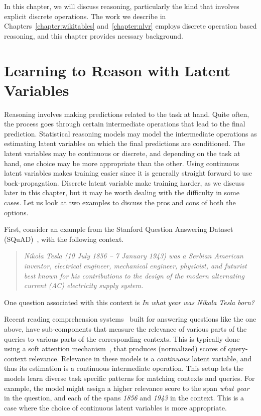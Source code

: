In this chapter, we will discuss reasoning, particularly the kind that involves
explicit discrete operations. The work we describe in
Chapters~\ref{chapter:wikitables} and~\ref{chapter:nlvr} employs discrete
operation based reasoning, and this chapter provides ncessary background.

\section{Learning to Reason with Latent Variables}
Reasoning involves making predictions related to the task at hand. Quite often,
the process goes through certain intermediate operations that lead to the final
prediction. Statistical reasoning models may model the intermediate operations as
estimating latent variables on which the final predictions are conditioned.
The latent variables may be continuous or discrete, and depending on the task at
hand, one choice may be more appropriate than the other. Using continuous latent
variables makes training easier since it is generally straight forward to use 
back-propagation. Discrete latent variable make training harder, as we discuss
later in this chapter, but it may be worth dealing with the difficulty in some
cases. Let us look at two examples to discuss the pros and cons of both the options.

First, consider an example from the Stanford Question Answering
Dataset (SQuAD)~\citep{Rajpurkar2016SQuAD10}, with the following context.
\begin{quote}
	\textit{Nikola Tesla (10 July 1856 – 7 January 1943) was a Serbian American
	inventor, electrical engineer, mechanical engineer, physicist, and
	futurist best known for his contributions to the design of the modern
	alternating current (AC) electricity supply system.}
\end{quote}
One question associated with this context is
\textit{In what year was Nikola Tesla born?}

Recent reading comprehension systems~\citep[among
others]{Seo2016BidirectionalAF,yu2018qanet} built for answering questions like
the one above, have sub-components that measure the relevance of various parts of
the queries to various parts of the corresponding contexts. This is typically
done using a soft attention mechanism~\citep{bahdanau:14}, that produces
(normalized) scores of query-context relevance. Relevance in these models is a 
\emph{continuous} latent variable, and thus its estimation is a continuous intermediate
operation. This setup lets the models learn diverse task specific patterns for
matching contexts and queries. For example, the model might assign a higher
relevance score to the span \textit{what year} in the question, and each of the
spans \textit{1856} and \textit{1943} in the context. This is a case where the
choice of continuous latent variables is more appropriate. 


